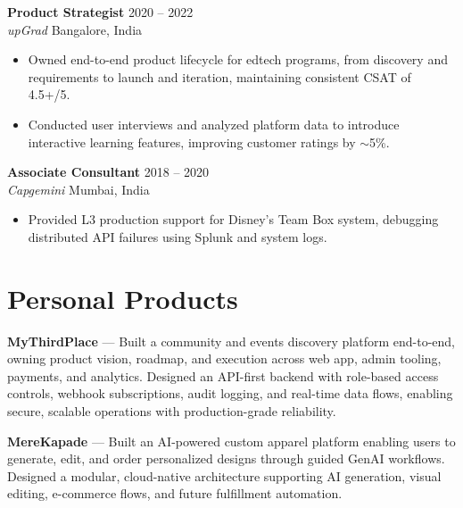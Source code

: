 \documentclass[10pt, a4paper]{article}
\begin{document}
\vspace{0.2em}

{\small \textbf{Product Strategist} \hfill 2020 -- 2022 \\
\textit{upGrad} \hfill Bangalore, India}

\begin{itemize}[leftmargin=1.2em, labelsep=0.4em, itemsep=0.2em, topsep=0.4em, parsep=0em]
    \item {\small Owned end-to-end product lifecycle for edtech programs, from discovery and requirements to launch and iteration, maintaining consistent CSAT of 4.5+/5.}
    \item {\small Conducted user interviews and analyzed platform data to introduce interactive learning features, improving customer ratings by $\sim$5\%.}
\end{itemize}

\vspace{0.2em}

{\small \textbf{Associate Consultant} \hfill 2018 -- 2020 \\
\textit{Capgemini} \hfill Mumbai, India}

\begin{itemize}[leftmargin=1.2em, labelsep=0.4em, itemsep=0.2em, topsep=0.4em, parsep=0em]
    \item {\small Provided L3 production support for Disney's Team Box system, debugging distributed API failures using Splunk and system logs.}
\end{itemize}

\section*{Personal Products}
\vspace{-0.1em}

{\small \textbf{MyThirdPlace} --- Built a community and events discovery platform end-to-end, owning product vision, roadmap, and execution across web app, admin tooling, payments, and analytics. Designed an API-first backend with role-based access controls, webhook subscriptions, audit logging, and real-time data flows, enabling secure, scalable operations with production-grade reliability.\par}

\vspace{0.2em}

{\small \textbf{MereKapade} --- Built an AI-powered custom apparel platform enabling users to generate, edit, and order personalized designs through guided GenAI workflows. Designed a modular, cloud-native architecture supporting AI generation, visual editing, e-commerce flows, and future fulfillment automation.\par}
\end{document}

